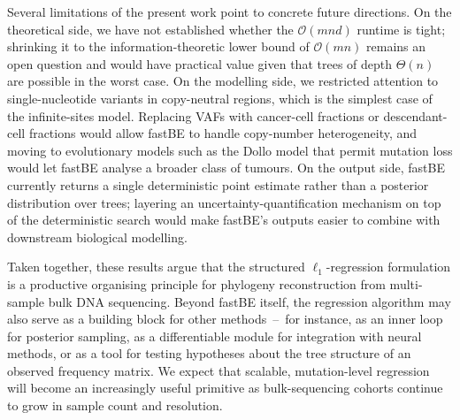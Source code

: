 \documentclass[11pt]{article}
\begin{document}
Several limitations of the present work point to concrete future directions. On the theoretical side, we have not established whether the $\mathcal{O}(mnd)$ runtime is tight; shrinking it to the information-theoretic lower bound of $\mathcal{O}(mn)$ remains an open question and would have practical value given that trees of depth $\Theta(n)$ are possible in the worst case. On the modelling side, we restricted attention to single-nucleotide variants in copy-neutral regions, which is the simplest case of the infinite-sites model. Replacing VAFs with cancer-cell fractions or descendant-cell fractions would allow fastBE to handle copy-number heterogeneity, and moving to evolutionary models such as the Dollo model that permit mutation loss would let fastBE analyse a broader class of tumours. On the output side, fastBE currently returns a single deterministic point estimate rather than a posterior distribution over trees; layering an uncertainty-quantification mechanism on top of the deterministic search would make fastBE's outputs easier to combine with downstream biological modelling.

Taken together, these results argue that the structured $\ell_1$-regression formulation is a productive organising principle for phylogeny reconstruction from multi-sample bulk DNA sequencing. Beyond fastBE itself, the regression algorithm may also serve as a building block for other methods~--~for instance, as an inner loop for posterior sampling, as a differentiable module for integration with neural methods, or as a tool for testing hypotheses about the tree structure of an observed frequency matrix. We expect that scalable, mutation-level regression will become an increasingly useful primitive as bulk-sequencing cohorts continue to grow in sample count and resolution.



\end{document}
